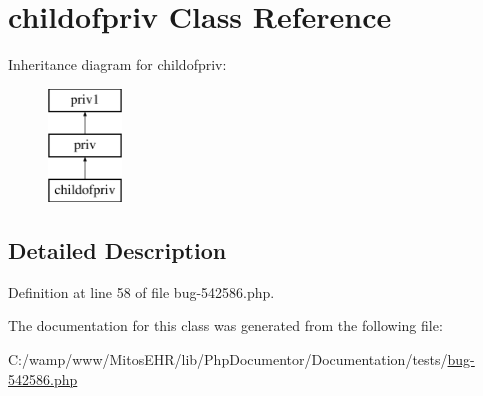 \hypertarget{classchildofpriv}{\section{childofpriv \-Class \-Reference}
\label{classchildofpriv}
}
\-Inheritance diagram for childofpriv\-:\begin{figure}[H]
\begin{center}
\leavevmode
\includegraphics[height=3.000000cm]{classchildofpriv}
\end{center}
\end{figure}


\subsection{\-Detailed \-Description}


\-Definition at line 58 of file bug-\/542586.\-php.



\-The documentation for this class was generated from the following file\-:\begin{DoxyCompactItemize}
\item 
\-C\-:/wamp/www/\-Mitos\-E\-H\-R/lib/\-Php\-Documentor/\-Documentation/tests/\hyperlink{bug-542586_8php}{bug-\/542586.\-php}\end{DoxyCompactItemize}
